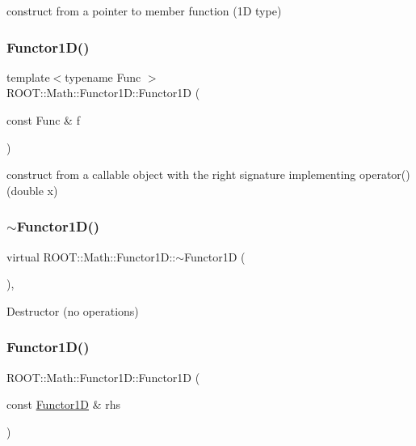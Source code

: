 construct from a pointer to member function (1D type) \mbox{\label{classROOT_1_1Math_1_1Functor1D_ac200eefbe8571f022f6b6a5d79fc7855}} 
\subsubsection{\texorpdfstring{Functor1D()}{Functor1D()}\hspace{0.1cm}{\footnotesize\ttfamily [3/8]}}
{\footnotesize\ttfamily template$<$typename Func $>$ \\
R\+O\+O\+T\+::\+Math\+::\+Functor1\+D\+::\+Functor1D (\begin{DoxyParamCaption}\item[{const Func \&}]{f }\end{DoxyParamCaption})\hspace{0.3cm}{\ttfamily [inline]}}

construct from a callable object with the right signature implementing operator() (double x) \mbox{\label{classROOT_1_1Math_1_1Functor1D_a270ac3bfa816f778226caad0e6731a5f}} 
\subsubsection{\texorpdfstring{$\sim$Functor1D()}{~Functor1D()}\hspace{0.1cm}{\footnotesize\ttfamily [1/2]}}
{\footnotesize\ttfamily virtual R\+O\+O\+T\+::\+Math\+::\+Functor1\+D\+::$\sim$\+Functor1D (\begin{DoxyParamCaption}{ }\end{DoxyParamCaption})\hspace{0.3cm}{\ttfamily [inline]}, {\ttfamily [virtual]}}

Destructor (no operations) \mbox{\label{classROOT_1_1Math_1_1Functor1D_a3323053da6385e3168b80163b266c600}} 
\subsubsection{\texorpdfstring{Functor1D()}{Functor1D()}\hspace{0.1cm}{\footnotesize\ttfamily [4/8]}}
{\footnotesize\ttfamily R\+O\+O\+T\+::\+Math\+::\+Functor1\+D\+::\+Functor1D (\begin{DoxyParamCaption}\item[{const \mbox{\hyperlink{classROOT_1_1Math_1_1Functor1D}{Functor1D}} \&}]{rhs }\end{DoxyParamCaption})\hspace{0.3cm}{\ttfamily [inline]}}

